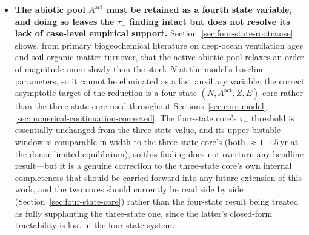 \documentclass[twocolumn,10pt]{article}
\begin{document}
\begin{itemize}
\item \textbf{The abiotic pool $A^{\text{act}}$ must be retained as a fourth state variable, and doing so leaves the $\tau_-$ finding intact but does not resolve its lack of case-level empirical support.} Section~\ref{sec:four-state-rootcause} shows, from primary biogeochemical literature on deep-ocean ventilation ages and soil organic matter turnover, that the active abiotic pool relaxes an order of magnitude more slowly than the stock $N$ at the model's baseline parameters, so it cannot be eliminated as a fast auxiliary variable; the correct asymptotic target of the reduction is a four-state $(N,A^{\text{act}},Z,E)$ core rather than the three-state core used throughout Sections~\ref{sec:core-model}--\ref{sec:numerical-continuation-corrected}. The four-state core's $\tau_-$ threshold is essentially unchanged from the three-state value, and its upper bistable window is comparable in width to the three-state core's (both $\approx1$--$1.5$\,yr at the donor-limited equilibrium), so this finding does not overturn any headline result---but it is a genuine correction to the three-state core's own internal completeness that should be carried forward into any future extension of this work, and the two cores should currently be read side by side (Section~\ref{sec:four-state-core}) rather than the four-state result being treated as fully supplanting the three-state one, since the latter's closed-form tractability is lost in the four-state system.

\end{itemize}
\end{document}
